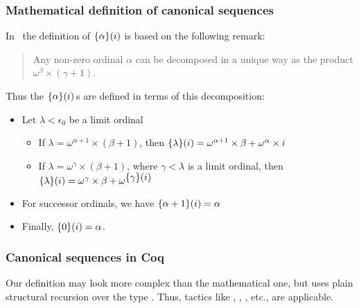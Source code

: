 \subsubsection{Mathematical definition of canonical sequences} 

In~\cite{KS81} the definition of $\mbox{$\{\alpha\}(i)$}$ is based on the following remark:
\begin{quote}
Any non-zero ordinal $\alpha$ can be decomposed in a unique way as the product
$\omega^\beta\times (\gamma+1)$.
\end{quote}

Thus the $\mbox{$\{\alpha\}(i)$}$\,s are defined in terms of this decomposition:
\begin{definition}
\label{def:canonseq-math}
  
\end{definition}
\begin{mathframe}
  \begin{itemize}
\item Let $\lambda<\epsilon_0$ be a limit ordinal 

\begin{itemize}
\item If $\lambda=\omega^{\alpha+1}\times (\beta+1)$, then 
$\mbox{$\{\lambda\}(i)$}= \omega^{\alpha+1}\times\beta +  \omega^\alpha \times i$
\item If $\lambda=\omega^{\gamma}\times (\beta+1)$, where $\gamma<\lambda$ is a limit ordinal, then 
$\mbox{$\{\lambda\}(i)$}=\omega^{\gamma}\times \beta + \omega^{\mbox{$\{\gamma\}(i)$}}$
\end{itemize}

\item For successor ordinals, we have $\mbox{$\{\alpha+1\}(i)$}= \alpha$ 

\item Finally, $\mbox{$\{0\}(i)$}= \alpha$.
\end{itemize}
\end{mathframe}

\subsubsection{Canonical sequences in Coq}

Our definition may look more complex than the mathematical one, but
uses plain structural recursion over the type . Thus, tactics like
, , , etc., are applicable. 

